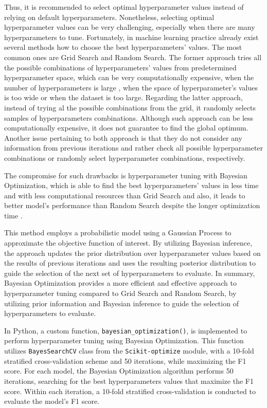 Thus, it is recommended to select optimal hyperparameter values instead of relying on default hyperparameters.
Nonetheless, selecting optimal hyperparameter values can be very challenging, especially when there are many hyperparameters to tune.
Fortunately, in machine learning practice already exist several methods how to choose the best hyperparameters' values. The most common ones are Grid Search and Random Search.
The former approach tries all the possible combinations of hyperparameters' values from predetermined hyperparameter space, which can be very computationally expensive, when the number of hyperparameters is large \citep{marinov2019hyperparameter}, when the space of hyperparameter's values is too wide or when the dataset is too large.
Regarding the latter approach, instead of trying al the possible combinations from the grid, it randomly selects samples of hyperparameters combinations. Although such approach can be less computationally expensive, it does not guarantee to find the global optimum.
Another issue pertaining to both approach is that they do not consider any information from previous iterations and rather check all possible hyperparameter combinations or randomly select hyperparameter combinations, respectively.

The compromise for such drawbacks is hyperparameter tuning with Bayesian Optimization, which is able to find the best hyperparameters' values in less time and with less computational resources than Grid Search and also, it leads to better model's performance than Random Search despite the longer optimization time \citep{drahokoupil2022application}.

This method employs a probabilistic model using a Gaussian Process to approximate the objective function of interest.
By utilizing Bayesian inference, the approach updates the prior distribution over hyperparameter values based on the results of previous iterations and uses the resulting posterior distribution to guide the selection of the next set of hyperparameters to evaluate.
In summary, Bayesian Optimization provides a more efficient and effective approach to hyperparameter tuning compared to Grid Search and Random Search, by utilizing prior information and Bayesian inference to guide the selection of hyperparameters to evaluate.

In Python, a custom function, \lstinline{bayesian_optimization()}, is implemented to perform hyperparameter tuning using Bayesian Optimization.
This function utilizes \lstinline{BayesSearchCV} class from the \lstinline{Scikit-optimize} module, with a 10-fold stratified cross-validation scheme and 50 iterations, while maximizing the F1 score.
For each model, the Bayesian Optimization algorithm performs 50 iterations, searching for the best hyperparameters values that maximize the F1 score. Within each iteration, a 10-fold stratified cross-validation is conducted to evaluate the model's F1 score.

